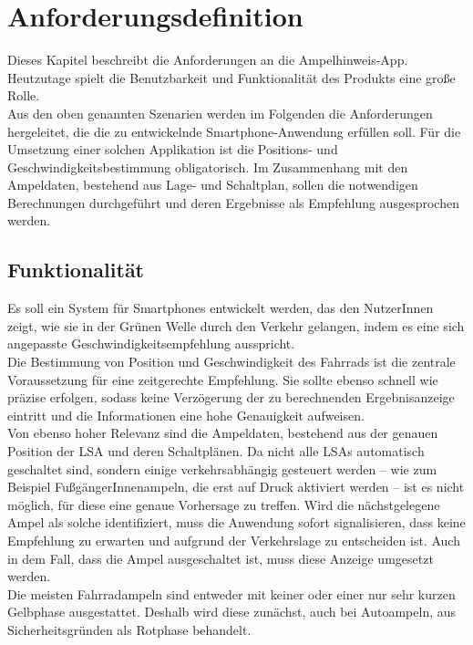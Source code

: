 \chapter{\label{chap:anforderungen}Anforderungsdefinition}
Dieses Kapitel beschreibt die Anforderungen an die Ampelhinweis-\gls{App}. Heutzutage spielt die Benutzbarkeit und Funktionalität des Produkts eine große Rolle.\\
Aus den oben genannten Szenarien werden im Folgenden die Anforderungen hergeleitet, die die zu entwickelnde \gls{Smartphone}-Anwendung erfüllen soll. Für die Umsetzung einer solchen Applikation ist die Positions- und Geschwindigkeitsbestimmung obligatorisch. Im Zusammenhang mit den Ampeldaten, bestehend aus Lage- und Schaltplan, sollen die notwendigen Berechnungen durchgeführt und deren Ergebnisse als Empfehlung ausgesprochen werden.
\section{Funktionalität}
Es soll ein System für \glspl{Smartphone} entwickelt werden, das den NutzerInnen zeigt, wie sie in der Grünen Welle durch den Verkehr gelangen, indem es eine sich angepasste Geschwindigkeitsempfehlung ausspricht.\\ 
Die Bestimmung von Position und Geschwindigkeit des Fahrrads ist die zentrale Voraussetzung für eine zeitgerechte Empfehlung. Sie sollte ebenso schnell wie präzise erfolgen, sodass keine Verzögerung der zu berechnenden Ergebnisanzeige eintritt und die Informationen eine hohe Genauigkeit aufweisen.\\
Von ebenso hoher Relevanz sind die Ampeldaten, bestehend aus der genauen Position der \gls{LSA} und deren Schaltplänen. Da nicht alle \glspl{LSA} automatisch geschaltet sind, sondern einige verkehrsabhängig gesteuert werden -- wie zum Beispiel FußgängerInnenampeln, die erst auf Druck aktiviert werden -- ist es nicht möglich, für diese eine genaue Vorhersage zu treffen. Wird die nächstgelegene Ampel als solche identifiziert, muss die Anwendung sofort signalisieren, dass keine Empfehlung zu erwarten und aufgrund der Verkehrslage zu entscheiden ist. Auch in dem Fall, dass die Ampel ausgeschaltet ist, muss diese Anzeige umgesetzt werden.\\
Die meisten Fahrradampeln sind entweder mit keiner oder einer nur sehr kurzen Gelbphase ausgestattet. Deshalb wird diese zunächst, auch bei Autoampeln, aus Sicherheitsgründen als Rotphase behandelt.
